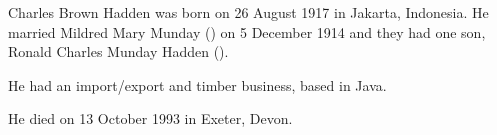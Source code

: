 
Charles Brown Hadden was born on 26 August 1917 in Jakarta, Indonesia.  He married Mildred Mary Munday () on 5 December 1914\cite{JHMbible,FlickrJohnHillTree} and they had one son, Ronald Charles Munday Hadden ().

He had an import/export and timber business, based in Java.

He died on 13 October 1993 in Exeter, Devon.\cite{CharlesBrownHaddenDeath}
